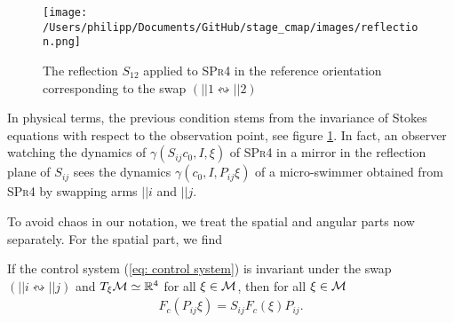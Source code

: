 \begin{figure}[h]
\centering
\texttt{[image: /Users/philipp/Documents/GitHub/stage\_cmap/images/reflection.png]}
\caption{The reflection $S_{12}$ applied to \textsc{SPr4} in the reference orientation corresponding to the swap $(||1 \leftrightsquigarrow ||2)$ }
\label{fig:reflection of swimmer}
\end{figure}

\begin{remark}
In physical terms, the previous condition stems from the invariance of Stokes equations with respect to the observation point, see figure \ref{fig:reflection of swimmer}. In fact, an observer watching the dynamics of $\gamma(S_{ij}c_0, I, \xi)$ of \textsc{SPr4} in a mirror in the reflection plane of $S_{ij}$ sees the dynamics $\gamma(c_0, I, P_{ij} \xi)$ of a micro-swimmer obtained from \textsc{SPr4} by swapping arms $||i$ and $||j$.
\end{remark}


To avoid chaos in our notation, we treat the spatial and angular parts now separately. For the spatial part, we find

\begin{proposition}
\label{prop: spatial permutation invariance}
If the control system (\ref{eq: control system}) is invariant under the swap $(||i \leftrightsquigarrow ||j)$ and $T_{\xi} \mathcal{M} \simeq \mathbb{R}^4$ for all $\xi \in \mathcal{M}$, then for all $\xi \in \mathcal{M}$
\begin{align}
	 F_c(P_{ij} \xi) = S_{ij} F_c(\xi) P_{ij}.
\end{align}
\end{proposition}

